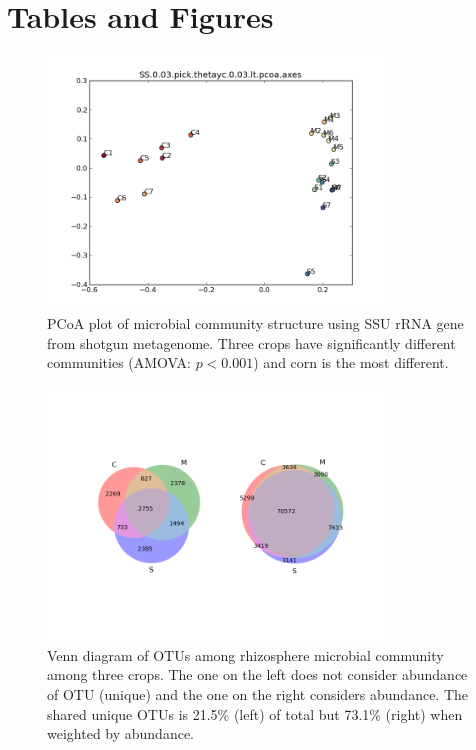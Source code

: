 \documentclass[12pt]{article}
\begin{document}

\section{Tables and Figures}

    \begin{figure}[tbph!]
    \centering
    \includegraphics[width=0.8\textwidth]{figures/otu-pcoa.png}
    \caption[PCoA plot of microbial community structure using SSU rRNA gene]{PCoA plot of microbial community structure using SSU rRNA gene from shotgun metagenome. Three crops have significantly different communities (AMOVA: $p < 0.001$) and corn is the most different.}
    \label{fig:otu-pcoa}
    \end{figure}


    \begin{figure}[tbph!]
    \centering
    \includegraphics[width=0.8\textwidth]{figures/otu-venn}
    \caption[Venn diagram of OTUs]{Venn diagram of OTUs among rhizosphere microbial community among three crops. The one on the left does not consider abundance of OTU (unique) and the one on the right considers abundance. The shared unique OTUs is 21.5\% (left) of total but 73.1\% (right) when weighted by abundance.}
    \label{fig:otu-venn}
    \end{figure}
\end{document}
